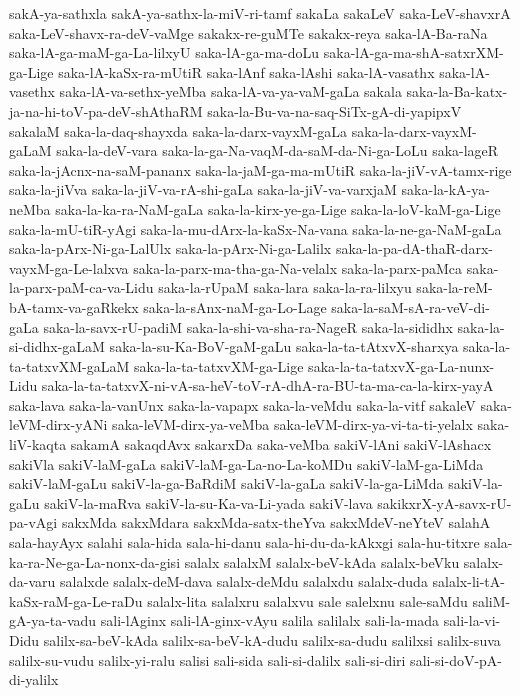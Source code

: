 {sakA-ya-sathxla
sakA-ya-sathx-la-miV-ri-tamf
sakaLa
sakaLeV
saka-LeV-shavxrA
saka-LeV-shavx-ra-deV-vaMge
sakakx-re-guMTe
sakakx-reya
saka-lA-Ba-raNa
saka-lA-ga-maM-ga-La-lilxyU
saka-lA-ga-ma-doLu
saka-lA-ga-ma-shA-satxrXM-ga-Lige
saka-lA-kaSx-ra-mUtiR
saka-lAnf
saka-lAshi
saka-lA-vasathx
saka-lA-vasethx
saka-lA-va-sethx-yeMba
saka-lA-va-ya-vaM-gaLa
sakala
saka-la-Ba-katx-ja-na-hi-toV-pa-deV-shAthaRM
saka-la-Bu-va-na-saq-SiTx-gA-di-yapipxV
sakalaM
saka-la-daq-shayxda
saka-la-darx-vayxM-gaLa
saka-la-darx-vayxM-gaLaM
saka-la-deV-vara
saka-la-ga-Na-vaqM-da-saM-da-Ni-ga-LoLu
saka-lageR
saka-la-jAcnx-na-saM-pananx
saka-la-jaM-ga-ma-mUtiR
saka-la-jiV-vA-tamx-rige
saka-la-jiVva
saka-la-jiV-va-rA-shi-gaLa
saka-la-jiV-va-varxjaM
saka-la-kA-ya-neMba
saka-la-ka-ra-NaM-gaLa
saka-la-kirx-ye-ga-Lige
saka-la-loV-kaM-ga-Lige
saka-la-mU-tiR-yAgi
saka-la-mu-dArx-la-kaSx-Na-vana
saka-la-ne-ga-NaM-gaLa
saka-la-pArx-Ni-ga-LalUlx
saka-la-pArx-Ni-ga-Lalilx
saka-la-pa-dA-thaR-darx-vayxM-ga-Le-lalxva
saka-la-parx-ma-tha-ga-Na-velalx
saka-la-parx-paMca
saka-la-parx-paM-ca-va-Lidu
saka-la-rUpaM
saka-lara
saka-la-ra-lilxyu
saka-la-reM-bA-tamx-va-gaRkekx
saka-la-sAnx-naM-ga-Lo-Lage
saka-la-saM-sA-ra-veV-di-gaLa
saka-la-savx-rU-padiM
saka-la-shi-va-sha-ra-NageR
saka-la-sididhx
saka-la-si-didhx-gaLaM
saka-la-su-Ka-BoV-gaM-gaLu
saka-la-ta-tAtxvX-sharxya
saka-la-ta-tatxvXM-gaLaM
saka-la-ta-tatxvXM-ga-Lige
saka-la-ta-tatxvX-ga-La-nunx-Lidu
saka-la-ta-tatxvX-ni-vA-sa-heV-toV-rA-dhA-ra-BU-ta-ma-ca-la-kirx-yayA
saka-lava
saka-la-vanUnx
saka-la-vapapx
saka-la-veMdu
saka-la-vitf
sakaleV
saka-leVM-dirx-yANi
saka-leVM-dirx-ya-veMba
saka-leVM-dirx-ya-vi-ta-ti-yelalx
saka-liV-kaqta
sakamA
sakaqdAvx
sakarxDa
saka-veMba
sakiV-lAni
sakiV-lAshacx
sakiVla
sakiV-laM-gaLa
sakiV-laM-ga-La-no-La-koMDu
sakiV-laM-ga-LiMda
sakiV-laM-gaLu
sakiV-la-ga-BaRdiM
sakiV-la-gaLa
sakiV-la-ga-LiMda
sakiV-la-gaLu
sakiV-la-maRva
sakiV-la-su-Ka-va-Li-yada
sakiV-lava
sakikxrX-yA-savx-rU-pa-vAgi
sakxMda
sakxMdara
sakxMda-satx-theYva
sakxMdeV-neYteV
salahA
sala-hayAyx
salahi
sala-hida
sala-hi-danu
sala-hi-du-da-kAkxgi
sala-hu-titxre
sala-ka-ra-Ne-ga-La-nonx-da-gisi
salalx
salalxM
salalx-beV-kAda
salalx-beVku
salalx-da-varu
salalxde
salalx-deM-dava
salalx-deMdu
salalxdu
salalx-duda
salalx-li-tA-kaSx-raM-ga-Le-raDu
salalx-lita
salalxru
salalxvu
sale
salelxnu
sale-saMdu
saliM-gA-ya-ta-vadu
sali-lAginx
sali-lA-ginx-vAyu
salila
salilalx
sali-la-mada
sali-la-vi-Didu
salilx-sa-beV-kAda
salilx-sa-beV-kA-dudu
salilx-sa-dudu
salilxsi
salilx-suva
salilx-su-vudu
salilx-yi-ralu
salisi
sali-sida
sali-si-dalilx
sali-si-diri
sali-si-doV-pA-di-yalilx
}
